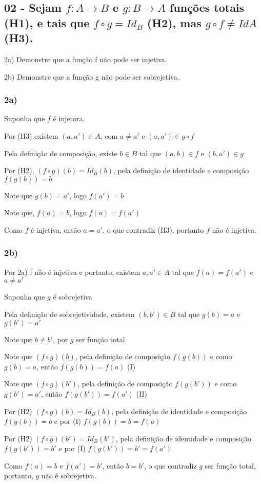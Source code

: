 \noindent
\subsection*{
02 - Sejam 
$ f \colon A \to B $ e $ g \colon B \to A $ 
funções totais \hypertarget{h1}{(H1)}, e tais que 
$ f \circ g = Id_{B} $ 
\hypertarget{h2}{(H2)}, mas 
$ g \circ f \neq IdA $ \hypertarget{h3}{(H3)}.
}



2a) Demonstre que a função f não pode ser injetiva.

2b) Demonstre que a função g não pode ser sobrejetiva.


\subsubsection*{2a)} 

Suponha que $ f $ é injetora. 

Por (H3) existem $ (a,a') \in A $, com $ a \neq a' $ e $ (a,a') \in g \circ f $

Pela definição de composição, existe $ b \in B $ tal que $ (a,b) \in f $ e $ (b,a') \in g $

Por (H2), $ (f \circ g)(b) = Id_{B}(b)$, pela definição de identidade e composição $ f(g(b)) = b $

Note que $ g(b) =  a' $, logo $ f(a') = b $
 
Note que, $ f(a) = b $, logo $ f(a) = f(a') $

Como $ f $ é injetiva, então $ a = a' $, o que contradiz (H3), portanto $ f $ não é injetiva.

\subsubsection*{2b)}

Por 2a) f não é injetiva e portanto, existem $ a, a' \in A $ tal que $ f(a) = f(a') $ e $ a \neq a' $

Suponha que $ g $ é sobrejetiva

Pela definição de sobrejetividade, existem $ (b, b') \in B $ tal que $ g(b) = a $ e $ g(b') = a' $

Note que $ b \neq b' $, por $ g $ ser função total

Note que $ (f \circ g)(b) $, pela definição de composição $ f(g(b)) $ e como $ g(b) = a $, então $ f(g(b)) = f(a) $ (I)

Note que $ (f \circ g)(b') $, pela definição de composição $ f(g(b')) $ e como $ g(b') = a' $, então $ f(g(b')) = f(a') $ (II)

Por (H2) $ (f \circ g)(b) = Id_{B}(b) $, pela definição de identidade e composição $ f(g(b)) = b $ e por (I) $ f(g(b)) = b = f(a) $

Por (H2) $ (f \circ g)(b') = Id_{B}(b') $, pela definição de identidade e composição $ f(g(b')) = b' $ e por (I) $ f(g(b')) = b' = f(a') $

Como $ f(a) = b $ e $ f(a') = b' $, então $ b = b' $, o que contradiz $ g $ ser função total, portanto, $ g $ não é sobrejetiva.

